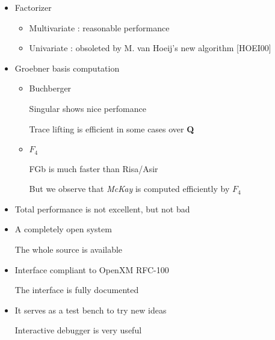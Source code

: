 \begin{slide}{}

\begin{itemize}
\item Factorizer

\begin{itemize}
\item Multivariate : reasonable performance

\item Univariate : obsoleted by M. van Hoeij's new algorithm [HOEI00]
\end{itemize}

\item Groebner basis computation

\begin{itemize}
\item Buchberger

Singular shows nice perfomance

Trace lifting is efficient in some cases over {\bf Q}

\item $F_4$

FGb is much faster than Risa/Asir

But we observe that {\it McKay} is computed efficiently by $F_4$
\end{itemize}
\end{itemize}

\end{slide}

\begin{slide}{}

\begin{itemize}
\item Total performance is not excellent, but not bad

\item A completely open system

The whole source is available

\item Interface compliant to OpenXM RFC-100

The interface is fully documented

\item It serves as a test bench to try new ideas

Interactive debugger is very useful
\end{itemize}

\end{slide}


